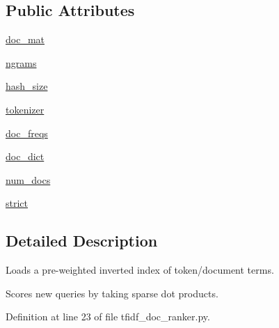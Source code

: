 \subsection*{Public Attributes}
\begin{DoxyCompactItemize}
\item 
\hyperlink{classparlai_1_1agents_1_1tfidf__retriever_1_1tfidf__doc__ranker_1_1TfidfDocRanker_ad36148d59e1bce7e5904899316317c61}{doc\+\_\+mat}
\item 
\hyperlink{classparlai_1_1agents_1_1tfidf__retriever_1_1tfidf__doc__ranker_1_1TfidfDocRanker_ab3d7c309a8de8cc664192169d95d9c87}{ngrams}
\item 
\hyperlink{classparlai_1_1agents_1_1tfidf__retriever_1_1tfidf__doc__ranker_1_1TfidfDocRanker_add0942063ebbb05487feadbe9b421d56}{hash\+\_\+size}
\item 
\hyperlink{classparlai_1_1agents_1_1tfidf__retriever_1_1tfidf__doc__ranker_1_1TfidfDocRanker_ae125548ea43894545541ae71fdc35ff7}{tokenizer}
\item 
\hyperlink{classparlai_1_1agents_1_1tfidf__retriever_1_1tfidf__doc__ranker_1_1TfidfDocRanker_a11677b2692fb3311eef1458762265ae9}{doc\+\_\+freqs}
\item 
\hyperlink{classparlai_1_1agents_1_1tfidf__retriever_1_1tfidf__doc__ranker_1_1TfidfDocRanker_af9cda5d944e01e08c45d0b3bbe6cb1ac}{doc\+\_\+dict}
\item 
\hyperlink{classparlai_1_1agents_1_1tfidf__retriever_1_1tfidf__doc__ranker_1_1TfidfDocRanker_a5fe0df360e9868ba2ce073ffc49a7d1b}{num\+\_\+docs}
\item 
\hyperlink{classparlai_1_1agents_1_1tfidf__retriever_1_1tfidf__doc__ranker_1_1TfidfDocRanker_a8c3f9e75f2a3b3ae127e87f25600c7fb}{strict}
\end{DoxyCompactItemize}


\subsection{Detailed Description}
\begin{DoxyVerb}Loads a pre-weighted inverted index of token/document terms.

Scores new queries by taking sparse dot products.
\end{DoxyVerb}
 

Definition at line 23 of file tfidf\+\_\+doc\+\_\+ranker.\+py.



